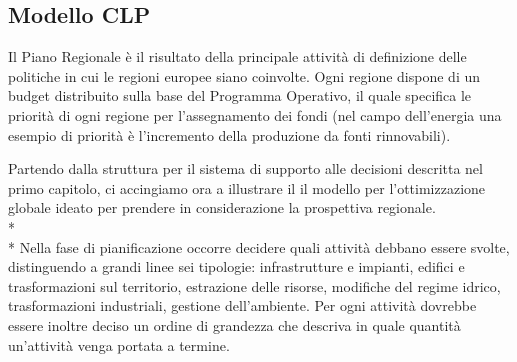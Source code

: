 \subsection{Modello CLP}
Il Piano Regionale è il risultato della principale attività di definizione delle politiche in cui le regioni europee siano coinvolte. Ogni regione dispone di un budget distribuito sulla base del Programma Operativo, il quale specifica le priorità di ogni regione per l'assegnamento dei fondi (nel campo dell'energia una esempio di priorità è l'incremento della produzione da fonti rinnovabili).

Partendo dalla struttura per il sistema di supporto alle decisioni descritta nel primo capitolo, ci accingiamo ora a illustrare il il modello per l'ottimizzazione globale ideato per prendere in considerazione la prospettiva regionale. 
\\* \\*
Nella fase di pianificazione occorre decidere quali attività debbano essere svolte, distinguendo a grandi linee sei tipologie: infrastrutture e impianti, edifici e trasformazioni sul territorio, estrazione delle risorse, modifiche del regime idrico, trasformazioni industriali, gestione dell'ambiente. Per ogni attività dovrebbe essere inoltre deciso un ordine di grandezza che descriva in quale quantità un'attività venga portata a termine.

